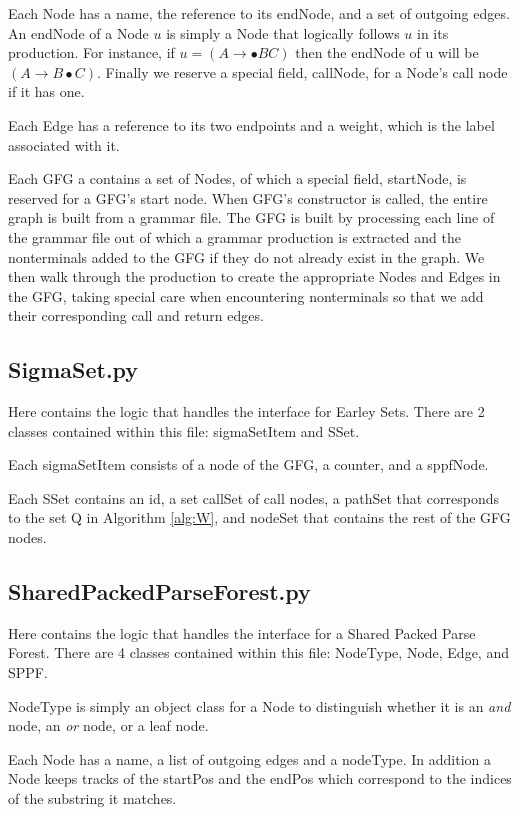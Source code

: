 \documentclass{sigplanconf}
\begin{document}
Each Node has a name, the reference to its endNode, and a set of outgoing edges. An endNode of a Node $u$ is simply a Node that logically follows $u$ in its production. For instance, if $u=(A\longrightarrow{\bullet{BC}})$ then the endNode of u will be $(A\longrightarrow{B\bullet{C}})$. Finally we reserve a special field, callNode, for a Node's call node if it has one.

Each Edge has a reference to its two endpoints and a weight, which is the label associated with it.

Each GFG a contains a set of Nodes, of which a special field, startNode, is reserved for a GFG's start node. When GFG's constructor is called, the entire graph is built from a grammar file. The GFG is built by processing each line of the grammar file out of which a grammar production is extracted and the nonterminals added to the GFG if they do not already exist in the graph. We then walk through the production to create the appropriate Nodes and Edges in the GFG, taking special care when encountering nonterminals so that we add their corresponding call and return edges.

\subsection{SigmaSet.py}

Here contains the logic that handles the interface for Earley Sets. There are 2 classes contained within this file: sigmaSetItem and SSet.

Each sigmaSetItem consists of a node of the GFG, a counter, and a sppfNode. 

Each SSet contains an id, a set callSet of call nodes, a pathSet that corresponds to the set Q in Algorithm \ref{alg:W}, and nodeSet that contains the rest of the GFG nodes.  

\subsection{SharedPackedParseForest.py}

Here contains the logic that handles the interface for a Shared Packed Parse Forest. There are 4 classes contained within this file: NodeType, Node, Edge, and SPPF.

NodeType is simply an object class for a Node to distinguish whether it is an \textit{and} node, an \textit{or} node, or a leaf node.

Each Node has a name, a list of outgoing edges and a nodeType. In addition a Node keeps tracks of the startPos and the endPos which correspond to the indices of the substring it matches. 
\end{document}
